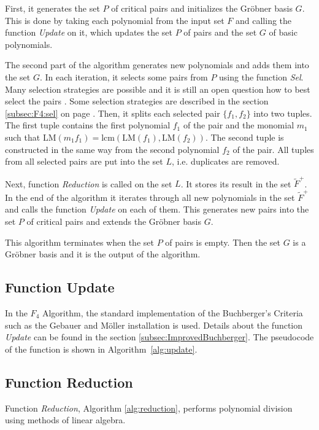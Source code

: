 First, it generates the set $P$ of critical pairs and initializes the Gr\"obner basis $G$. This is done by taking each polynomial from the input set $F$ and calling the function \textit{Update} on it, which updates the set $P$ of pairs and the set $G$ of basic polynomials.

The second part of the algorithm generates new polynomials and adds them into the set $G$. In each iteration, it selects some pairs from $P$ using the function \textit{Sel}. Many selection strategies are possible and it is still an open question how to best select the pairs \cite{F4}. Some selection strategies are described in the section \ref{subsec:F4:sel} on page \pageref{subsec:F4:sel}. Then, it splits each selected pair $\{f_1, f_2\}$ into two tuples. The first tuple contains the first polynomial $f_1$ of the pair and the monomial $m_1$ such that $\textrm{LM}(m_1 f_1) = \textrm{lcm}(\textrm{LM}(f_1),\textrm{LM}(f_2))$. The second tuple is constructed in the same way from the second polynomial $f_2$ of the pair. All tuples from all selected pairs are put into the set $L$, i.e. duplicates are removed.

Next, function \textit{Reduction} is called on the set $L$. It stores its result in the set $\tilde{F}^+$. In the end of the algorithm it iterates through all new polynomials in the set $\tilde{F}^+$ and calls the function \textit{Update} on each of them. This generates new pairs into the set $P$ of critical pairs and extends the Gr\"obner basis $G$.

This algorithm terminates when the set $P$ of pairs is empty. Then the set $G$ is a Gr\"obner basis and it is the output of the algorithm.



\subsection{Function Update}
In the $F_4$ Algorithm, the standard implementation of the Buchberger's Criteria such as the Gebauer and M\"oller installation \cite{Gebauer-Moller88} is used. Details about the function \textit{Update} can be found in the section \ref{subsec:ImprovedBuchberger}. The pseudocode of the function is shown in Algorithm~\ref{alg:update}.

\subsection{Function Reduction}
Function \textit{Reduction}, Algorithm \ref{alg:reduction}, performs polynomial division using methods of linear algebra.

